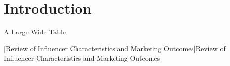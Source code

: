
\section{Introduction}





\clearpage
\begin{landscape}
\thispagestyle{empty}
\landscapepageno

\noindent
\begin{minipage}[c][6.35in][c]{9in}
\centering

\huge A Large Wide Table

\vspace{0.3em}
\captionsetup{type=table,hypcap=false}
[Review of Influencer Characteristics and Marketing Outcomes]{Review of Influencer Characteristics and Marketing Outcomes}
\label{tab:table1_conceptual}
\end{minipage}
\end{landscape}
\clearpage

\begin{landscape}
\thispagestyle{empty}
\landscapepageno

\noindent

\end{landscape}
\clearpage



